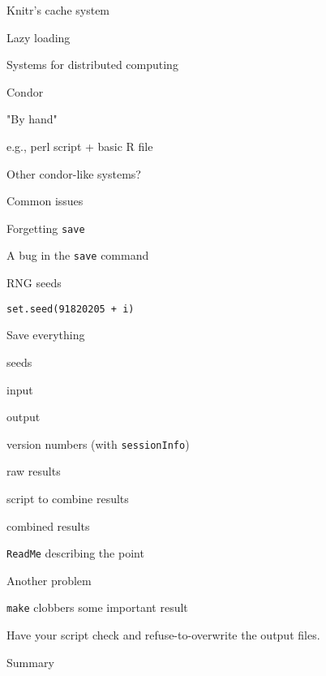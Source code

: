 \documentclass[12pt,t]{beamer}
\begin{document}
\begin{frame}{Knitr's cache system}

\note{
}
\end{frame}



\begin{frame}{Lazy loading}

\note{
}
\end{frame}




\begin{frame}{Systems for distributed computing}

\bbi
\item Condor
\item "By hand"
  \bi
  \item e.g., perl script + basic R file
  \ei
\item Other condor-like systems?
\ei

\note{
}
\end{frame}


\begin{frame}{Common issues}

\bbi
\item Forgetting {\tt save}
\item A bug in the {\tt save} command
\ei

\note{
}
\end{frame}




\begin{frame}{RNG seeds}

{\tt set.seed(91820205 + i)}

\end{frame}



\begin{frame}{Save everything}

\bbi
\item seeds
\item input
\item output
\item version numbers (with {\tt sessionInfo})
\item raw results
\item script to combine results
\item combined results
\item {\tt ReadMe} describing the point
\ei

\end{frame}


\begin{frame}{Another problem}

{\tt make} clobbers some important result

\bbi
\item Have your script check and refuse-to-overwrite the output files.
\ei

\note{

}
\end{frame}


\begin{frame}{Summary}

\note{
}
\end{frame}
\end{document}
